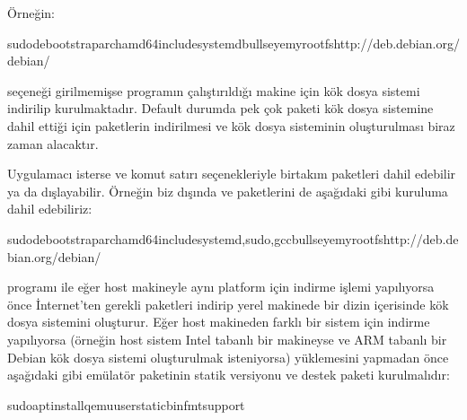\documentclass[a4paper,10pt,turkish]{sphinxmanual}
\begin{document}
\sphinxAtStartPar
Örneğin:

\begin{sphinxVerbatim}[commandchars=\\\{\}]
\PYGZdl{}sudodebootstrap\PYGZhy{}\PYGZhy{}archamd64\PYGZhy{}\PYGZhy{}includesystemdbullseyemyrootfshttp://deb.debian.org/debian/
\end{sphinxVerbatim}

\sphinxAtStartPar
{} seçeneği girilmemişse programın çalıştırıldığı makine için kök dosya sistemi indirilip
kurulmaktadır. Default durumda  pek çok paketi kök dosya sistemine dahil ettiği için
paketlerin indirilmesi ve kök dosya sisteminin oluşturulması biraz zaman alacaktır.

\sphinxAtStartPar
Uygulamacı isterse  ve  komut satırı seçenekleriyle birtakım paketleri dahil
edebilir ya da dışlayabilir. Örneğin biz  dışında  ve  paketlerini de aşağıdaki gibi
kuruluma dahil edebiliriz:

\begin{sphinxVerbatim}[commandchars=\\\{\}]
\PYGZdl{}sudodebootstrap\PYGZhy{}\PYGZhy{}archamd64\PYGZhy{}\PYGZhy{}includesystemd,sudo,gccbullseyemyrootfshttp://deb.debian.org/debian/
\end{sphinxVerbatim}

\sphinxAtStartPar
{} programı ile eğer host makineyle aynı platform için indirme işlemi yapılıyorsa 
önce İnternet’ten gerekli paketleri indirip yerel makinede bir dizin içerisinde kök dosya sistemini
oluşturur. Eğer host makineden farklı bir sistem için indirme yapılıyorsa (örneğin host sistem Intel
tabanlı bir makineyse ve ARM tabanlı bir Debian kök dosya sistemi oluşturulmak isteniyorsa) 
yüklemesini yapmadan önce aşağıdaki gibi  emülatör paketinin statik versiyonu ve  destek
paketi kurulmalıdır:

\begin{sphinxVerbatim}[commandchars=\\\{\}]
\PYGZdl{}sudoaptinstallqemu\PYGZhy{}user\PYGZhy{}staticbinfmt\PYGZhy{}support
\end{sphinxVerbatim}
\end{document}
